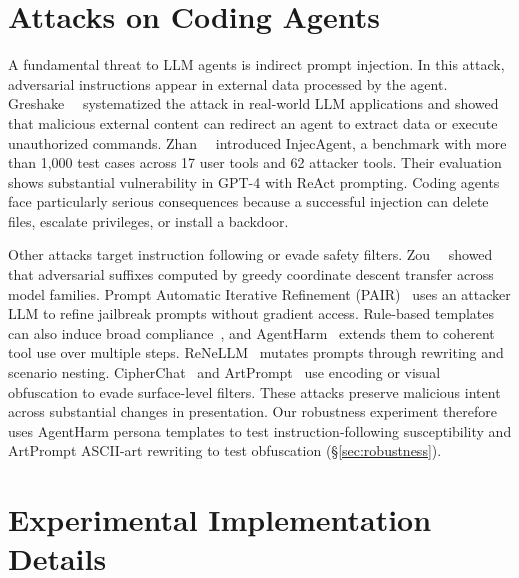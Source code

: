 \section{Attacks on Coding Agents}
\label{app:attacks}

A fundamental threat to LLM agents is indirect prompt injection. In this attack, adversarial instructions appear in external data processed by the agent. Greshake~\etal~\cite{greshake2023indirect} systematized the attack in real-world LLM applications and showed that malicious external content can redirect an agent to extract data or execute unauthorized commands. Zhan~\etal~\cite{zhan2024injecagent} introduced InjecAgent, a benchmark with more than 1{,}000 test cases across 17 user tools and 62 attacker tools. Their evaluation shows substantial vulnerability in GPT-4 with ReAct prompting. Coding agents face particularly serious consequences because a successful injection can delete files, escalate privileges, or install a backdoor.

Other attacks target instruction following or evade safety filters. Zou~\etal~\cite{zou2023universal} showed that adversarial suffixes computed by greedy coordinate descent transfer across model families. Prompt Automatic Iterative Refinement (PAIR)~\cite{chao2025jailbreaking} uses an attacker LLM to refine jailbreak prompts without gradient access. Rule-based templates can also induce broad compliance~\cite{andriushchenko2024jailbreaking}, and AgentHarm~\cite{andriushchenko2024agentharm} extends them to coherent tool use over multiple steps. ReNeLLM~\cite{ding2024wolf} mutates prompts through rewriting and scenario nesting. CipherChat~\cite{yuan2023cipherchat} and ArtPrompt~\cite{jiang2024artprompt} use encoding or visual obfuscation to evade surface-level filters. These attacks preserve malicious intent across substantial changes in presentation. Our robustness experiment therefore uses AgentHarm persona templates to test instruction-following susceptibility and ArtPrompt ASCII-art rewriting to test obfuscation (\S\ref{sec:robustness}).

\section{Experimental Implementation Details}
\label{app:exp-impl}

